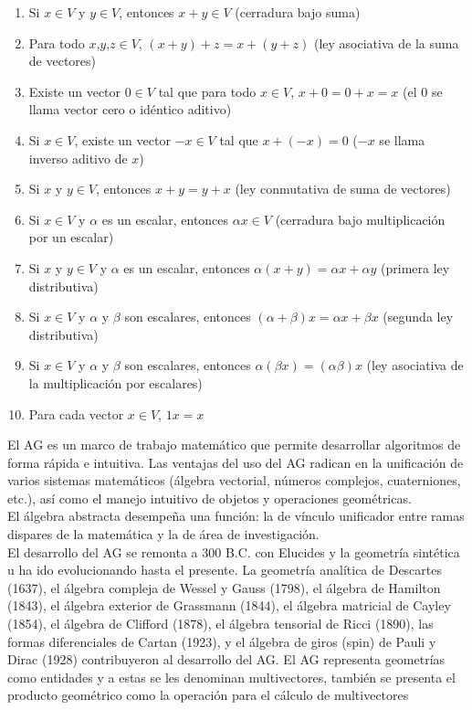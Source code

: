 \begin{enumerate}
	\item Si $x \in V$ y $y \in V$, entonces $x+y \in V$ (cerradura bajo suma)
	\item Para todo $x$,$y$,$z \in V$, $(x+y)+z=x+(y+z)$ (ley asociativa de la suma de vectores)
	\item Existe un vector $0 \in V$ tal que para todo $x \in V$, $x+0=0+x=x$ (el $0$ se llama vector cero o idéntico aditivo)
	\item Si $x \in V$, existe un vector $-x \in V$ tal que $x+(-x)=0$ ($-x$ se llama inverso aditivo de $x$)
	\item Si $x$ y $y \in V$, entonces $x+y=y+x$ (ley conmutativa de suma de vectores)
	\item Si $x \in V$ y $\alpha$ es un escalar, entonces $\alpha x \in V$ (cerradura bajo multiplicación por un escalar)
	\item Si $x$ y $y \in V$ y $\alpha$ es un escalar, entonces $\alpha(x+y) =\alpha x+ \alpha y$ (primera ley distributiva)
	\item Si $x \in V$ y $\alpha$ y $\beta$ son escalares, entonces $(\alpha+\beta)x= \alpha x+ \beta x$ (segunda ley distributiva)
	\item Si $x \in V$ y $\alpha$ y $\beta$ son escalares, entonces $\alpha(\beta x)=(\alpha \beta)x$
	(ley asociativa de la multiplicación por escalares)
	\item Para cada vector $x \in V$, $1x=x$
\end{enumerate}


El AG es un marco de trabajo matemático que permite desarrollar algoritmos de forma rápida e intuitiva. Las ventajas del uso del AG radican en la unificación de varios sistemas matemáticos (álgebra vectorial, números complejos, cuaterniones, etc.), así como el manejo intuitivo de objetos y operaciones geométricas\cite{FoundOfAGC}.\\

El álgebra abstracta desempeña una función: la de vínculo unificador entre ramas dispares de la matemática y la de
área de investigación. \\





El desarrollo del AG se remonta a 300 B.C. con Elucides y la geometría sintética u ha ido evolucionando hasta el presente. La geometría analítica de Descartes (1637), el álgebra compleja de Wessel y Gauss (1798), el álgebra de Hamilton (1843), el álgebra exterior de Grassmann (1844), el álgebra matricial de Cayley (1854), el álgebra de Clifford (1878), el álgebra tensorial de Ricci (1890), las formas diferenciales de Cartan (1923), y el álgebra de giros (spin) de Pauli y Dirac (1928) contribuyeron al desarrollo del AG. El AG representa geometrías como entidades y a estas se les denominan multivectores, también se presenta el producto geométrico como la operación para el cálculo de multivectores\cite{BayroCorrochano2010}\\


